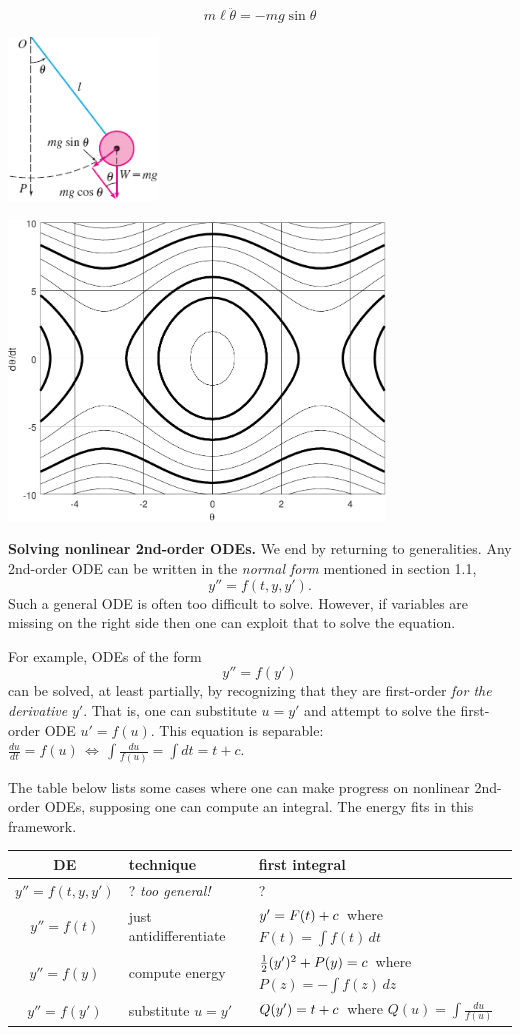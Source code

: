 \documentclass[12pt]{article}
\theoremstyle{definition}
\begin{document}
$$m \ell \ddot{\theta} = -m g \sin\theta$$

\includegraphics[width=0.3\textwidth]{pendulum}

\includegraphics[width=0.75\textwidth]{pendulumcurves}


\medskip
\textbf{Solving nonlinear 2nd-order ODEs.}  We end by returning to generalities.  Any 2nd-order ODE can be written in the \emph{normal form} mentioned in section 1.1,
    $$y'' = f(t,y,y').$$
Such a general ODE is often too difficult to solve.  However, if variables are missing on the right side then one can exploit that to solve the equation.

For example, ODEs of the form
    $$y'' = f(y')$$
can be solved, at least partially, by recognizing that they are first-order \emph{for the derivative} $y'$.  That is, one can substitute $u=y'$ and attempt to solve the first-order ODE $u'=f(u)$.  This equation is separable: \, $\frac{du}{dt} = f(u) \, \iff \, \int \frac{du}{f(u)} = \int dt = t + c$.

The table below lists some cases where one can make progress on nonlinear 2nd-order ODEs, supposing one can compute an integral.  The energy fits in this framework.

\medskip
\begin{tabular}{c|l|l}
DE & technique & first integral \\ \hline \hline
$y'' = f(t,y,y')$ & ? \quad \emph{too general!} & ? \\ \hline
$y'' = f(t)$ & just antidifferentiate & $y' = F(t)+c \large\strut$\, where $F(t) = \int f(t)\,dt$ \\ \hline
$y'' = f(y)$ & compute energy & $\frac{1}{2} (y')^2 + P(y) = c \large\strut$\, where $P(z) = -\int f(z)\,dz$ \\ \hline
$y'' = f(y')$ & substitute $u=y'$ & $Q(y') = t + c \large\strut$\, where $Q(u)=\int \frac{du}{f(u)}$
\end{tabular}
\end{document}
